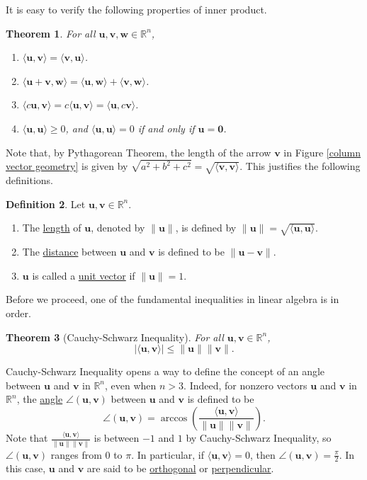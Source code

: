 \documentclass[12pt,letterpaper]{book}
\numberwithin{equation}{section}
\newtheorem{thm}{\textbf{Theorem}}[section]
\theoremstyle{definition}
\newtheorem{defi}[thm]{\textbf{Definition}}
\newcommand{\vu}{\bm{u}}
\newcommand{\vv}{\bm{v}}
\newcommand{\vw}{\bm{w}}
\newcommand{\veczero}{\bm{0}}
\begin{document}
It is easy to verify the following properties of inner product.

\begin{thm}\label{inner product properties} For all $\vu,\vv,\vw\in \mathbb{R}^n$,
\begin{enumerate}
\item $\langle \vu, \vv \rangle=\langle \vv, \vu \rangle$.
\item $\langle  \vu+\vv , \vw \rangle=\langle \vu, \vw \rangle+\langle \vv, \vw\rangle$.
\item $\langle c\vu, \vv \rangle=c\langle \vu, \vv\rangle=\langle \vu,c\vv\rangle$.
\item $\langle \vu, \vu\rangle \geq 0$, and $\langle \vu, \vu\rangle=0$ if and only if $\vu=\veczero$.
\end{enumerate}
\end{thm}

 Note that, by Pythagorean Theorem, the length of the arrow $\vv$ in Figure \ref{column vector geometry} is given by $\sqrt{a^2+b^2+c^2}=\sqrt{\langle \vv, \vv\rangle}$. This justifies the following definitions.

\begin{defi}\label{rngeo} Let $\vu,\vv\in \mathbb{R}^n$.
\begin{enumerate}
\item The \underline{length} of $\vu$, denoted by $\|\vu\|$, is defined by $\|\vu\|=\sqrt{\langle \vu,\vu\rangle}$.
\item The \underline{distance} between $\vu$ and $\vv$ is defined to be $\|\vu-\vv\|$.
\item $\vu$ is called a \underline{unit vector} if $\|\vu\|=1$.
\end{enumerate}
\end{defi}

Before we proceed, one of the fundamental inequalities in linear algebra is in order.

\begin{thm}[Cauchy-Schwarz Inequality]  For all $\vu,\vv \in \mathbb{R}^n$,
$$|\langle \vu,\vv \rangle|\leq \|\vu\|\|\vv\|.$$
\end{thm}

Cauchy-Schwarz Inequality opens a way to define the concept of an angle between $\vu$ and $\vv$ in $\mathbb{R}^n$, even when $n>3$. Indeed, for nonzero vectors $\vu$ and $\vv$ in $\mathbb{R}^n$, the \underline{angle} $\angle(\vu,\vv)$ between $\vu$ and $\vv$ is defined to be
$$\angle(\vu,\vv)=\arccos\left(\frac{\langle \vu,\vv\rangle}{\|\vu\|\|\vv\|}\right).$$
Note that $\frac{\langle \vu,\vv\rangle}{\|\vu\|\|\vv\|}$ is between $-1$ and $1$ by Cauchy-Schwarz Inequality, so $\angle(\vu,\vv)$ ranges from $0$ to $\pi$. In particular, if $\langle \vu,\vv\rangle=0$, then $\angle(\vu,\vv)=\frac{\pi}{2}$. In this case, $\vu$ and $\vv$ are said to be \ul{orthogonal} or \ul{perpendicular}.
\end{document}
